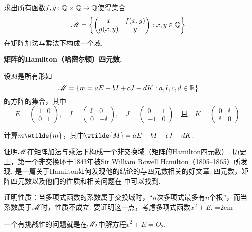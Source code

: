 \begin{mybox}
  \begin{problem}
    求出所有函数$f,g:\mathbb Q\times\mathbb Q\to\mathbb Q$使得集合
    \[
      \MM = \left\{
        \begin{pmatrix}
          x & f(x,y) \\
          g(x,y) & y
        \end{pmatrix}:x,y\in\MQ
      \right\}
    \]
    在矩阵加法与乘法下构成一个域.
  \end{problem}
\end{mybox}

\begin{mybox}
  \begin{problem}
    {\bfseries 矩阵的Hamilton{\hyds （}哈密尔顿{\hyds ）}四元数.}

    设$M$是所有形如
    \[
      \mathscr M = \{ m=aE+bI+cJ+dK:a,b,c,d\in\mathbb R \}
    \]
    的方阵的集合，其中
    \[
      E = \begin{pmatrix}
         1 & 0\\
         0 & 1
      \end{pmatrix},\quad I = \begin{pmatrix}
        \ii & 0 \\
        0 & -\ii
      \end{pmatrix},\quad J = \begin{pmatrix}
        0 & 1 \\
        -1 & 0
      \end{pmatrix}\quad \text{且}\quad
      K = \begin{pmatrix}
        0 & \ii \\
        \ii & 0
      \end{pmatrix}.
    \]
    \begin{enum}
      \item 计算$m\wtilde{m}$，其中$\wtilde{M}=aE-bI-cJ-dK$.
      \item 证明$\mathscr M$在矩阵加法与乘法下构成一个非交换域（矩阵的Hamilton四元数）. 历史上，第一个非交换环于1843年被Sir William Rowell Hamilton（1805--1865）所发现. \cite{7}是一篇关于Hamilton如何发现他的结论的与四元数相关的好文章. 四元数，矩阵四元数以及他们的性质和相关问题在 \cite{62} 中可以找到.
      \item 证明性质：当多项式函数的系数属于交换域时，``{\kaishu $n$次多项式最多有$n$个根}''，而当系数属于$\mathscr M$时，性质不成立. 要证明这一点，考虑多项式函数$x^2+E$. \parindent=2em

          一个{\kaishu 有挑战性的问题}就是在$\mathscr M_2$中解方程$x^2+E=O_2$.
    \end{enum}
  \end{problem}
\end{mybox}

